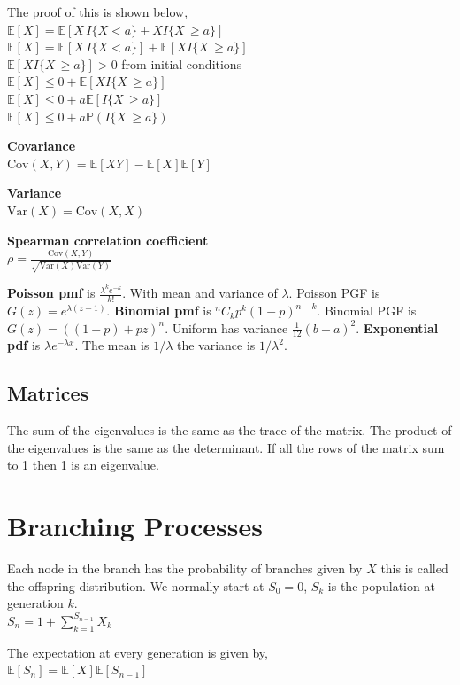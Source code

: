 \documentclass[10pt,landscape,a4paper]{article}
\begin{document}
\begin{multicols*}{4}
The proof of this is shown below, \\
$\mathbb{E}[X] = \mathbb{E}[X \, I\{X<a\} + X I\{X \, \geq a\}]$ \\
$\mathbb{E}[X] = \mathbb{E}[X \, I\{X<a\}] + \mathbb{E}[X I\{X \, \geq a\}]$ \\
$\mathbb{E}[X I\{X \, \geq a\}] > 0$ from initial conditions \\
$\mathbb{E}[X] \leq 0 + \mathbb{E}[X I\{X \, \geq a\}]$ \\
$\mathbb{E}[X] \leq 0 + a\mathbb{E}[I\{X \, \geq a\}]$ \\
$\mathbb{E}[X] \leq 0 + a\mathbb{P}(I\{X \, \geq a\})$

\textbf{Covariance} \\
$\text{Cov}(X,Y) = \mathbb{E}[XY] - \mathbb{E}[X]\mathbb{E}[Y]$

\textbf{Variance} \\
$\text{Var}(X) = \text{Cov}(X,X)$

\textbf{Spearman correlation coefficient} \\
$\rho = \frac{\text{Cov}(X, Y)}{\sqrt{\text{Var}(X) \text{Var}(Y)}}$

\textbf{Poisson pmf} is $\frac{\lambda^k e^{-k}}{k!}$. With mean and variance of $\lambda$.
Poisson PGF is $G(z) = e^{\lambda(z-1)}$.
\textbf{Binomial pmf} is ${}^nC_k p^k (1-p)^{n-k}$. Binomial PGF is $G(z) = ((1-p)+pz)^n$.
Uniform has variance $\frac{1}{12}(b-a)^2$.
\textbf{Exponential pdf} is $\lambda e^{-\lambda x}$. The mean is $1/\lambda$
the variance is $1/\lambda^2$.
\subsection{Matrices}
The sum of the eigenvalues is the same as the trace of the matrix.
The product of the eigenvalues is the same as the determinant.
If all the rows of the matrix sum to 1 then 1 is an eigenvalue.
\section{Branching Processes}
Each node in the branch has the probability of branches given by $X$ this is
called the offspring distribution.
We normally start at $S_0 = 0$, $S_k$ is the population at generation $k$. \\
$S_n = 1 + \sum_{k=1}^{S_{n-1}} X_k$

The expectation at every generation is given by, \\
$\mathbb{E}[S_n] = \mathbb{E}[X] \mathbb{E}[S_{n-1}]$


\end{multicols*}
\end{document}
